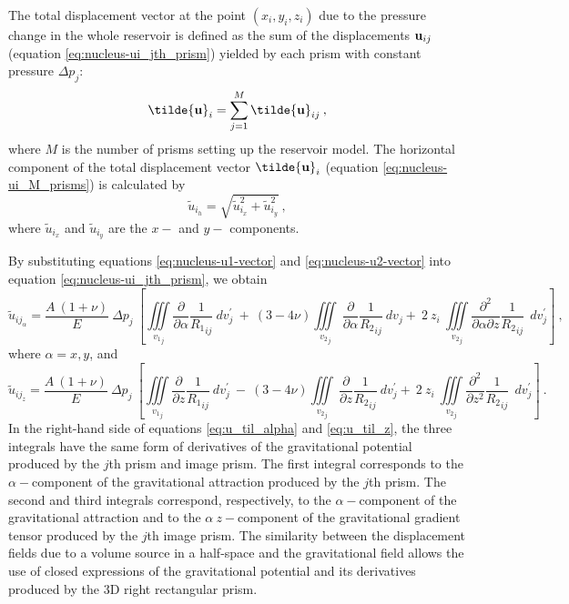 \documentclass[journal abbreviation, manuscript]{copernicus}
\begin{document}
The total displacement vector at the point $(x_i, y_i, z_i)$ due to the
pressure change in the whole reservoir is defined as the sum of the displacements 
${\bf{u}}_{ij}$ (equation \ref{eq:nucleus-ui_jth_prism}) yielded by each prism 
with constant pressure $\Delta p_{j}$:
\begin{equation}
{\bf{\tilde{u}}}_{i} = \sum_{j=1}^{M} {\bf{\tilde{u}}}_{ij} \: ,
\label{eq:nucleus-ui_M_prisms}
\end{equation}
where $M$ is the number of prisms setting up the reservoir model.
The horizontal component of the total displacement vector ${\bf{\tilde{u}}}_{i}$ 
(equation \ref{eq:nucleus-ui_M_prisms}) is calculated by 
\begin{equation}
{\tilde{u}}_{{i}_h} = \sqrt{ {\tilde{u}}_{{i}_x}^{2}  +  {\tilde{u}}_{{i}_y}^{2} } 
\: ,
\label{eq:horizontal_displacement}
\end{equation}
where ${\tilde{u}}_{{i}_x}$ and ${\tilde{u}}_{{i}_y}$ are the $x-$ and $y-$ components.

By substituting equations \ref{eq:nucleus-u1-vector} and \ref{eq:nucleus-u2-vector} 
into equation \ref{eq:nucleus-ui_jth_prism}, we obtain
\begin{equation}
{\tilde{u}}_{{ij}_\alpha} = \frac{A  \: (1 + \nu)}{E} 
\: \Delta p_{j}  \: \left[ \iiint\limits_{{v_{1}}_{j}} 
\frac{\partial }{\partial \alpha} {\frac{1}{{R_1}_{ij}}} \:  dv_{j}^{\prime} 
\: + \: 
(3  - 4 \nu)  \iiint\limits_{{v_{2}}_{j}}
\: \frac{\partial }{\partial \alpha} {\frac{1}{{R_2}_{ij}}}\:  dv_j
+ \: 2 \: z_{i} \:  \iiint\limits_{{v_{2}}_{j}}
\frac{\partial^{2}  }{\partial \alpha \partial z} {\frac{1}{{R_2}_{ij}}}  \:\:  dv_{j}^{\prime} 
\right] \: , 
\label{eq:u_til_alpha}
\end{equation}
where $\alpha = x, y$, and
\begin{equation}
{\tilde{u}}_{{ij}_z} = \frac{A  \: (1 + \nu)}{E} 
\: \Delta p_{j}  \: \left[ \iiint\limits_{{v_{1}}_{j}}
\frac{\partial }{\partial z} {\frac{1}{{R_1}_{ij}}} \: dv_{j}^{\prime} 
\: - \: (3  - 4 \nu)  \iiint\limits_{{v_{2}}_{j}}
\: \frac{\partial }{\partial z} {\frac{1}{{R_2}_{ij}}}\: dv_{j}^{\prime}
+ \: 2 \: z_{i} \:  \iiint\limits_{{v_{2}}_{j}}
\frac{\partial^{2}  }{\partial z^{2}} {\frac{1}{{R_2}_{ij}}}  \:\: dv_{j}^{\prime} 
\right] \: .
\label{eq:u_til_z}
\end{equation}
In the right-hand side of equations \ref{eq:u_til_alpha} and \ref{eq:u_til_z}, the three integrals have the same form of derivatives of the gravitational potential produced by the $j$th prism and image prism. 
The first integral corresponds to the $\alpha-$component of the gravitational attraction 
produced by the $j$th prism.
The second and third integrals correspond, respectively, to the $\alpha-$component of the gravitational attraction and to the $\alpha \:z-$component of the gravitational 
gradient tensor produced by the $j$th image prism. 
The similarity between the displacement fields due to a volume source in a half-space and the gravitational field allows the use of closed expressions of the gravitational potential and its derivatives produced by the 3D right rectangular prism.  
\end{document}
